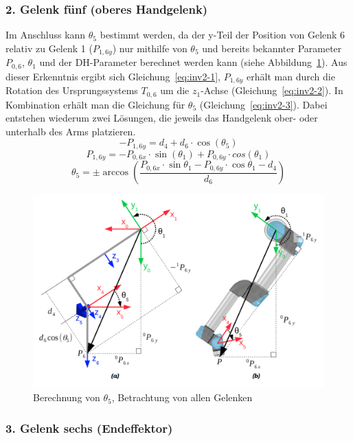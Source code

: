 \subsubsection{2. Gelenk fünf (oberes Handgelenk)}

Im Anschluss kann $\theta_5$ bestimmt werden, da der y-Teil der Position von Gelenk 6 relativ zu Gelenk 1 ($P_{1,6y}$) nur mithilfe von $\theta_5$ und bereits bekannter Parameter $P_{0,6}$, $\theta_1$ und der DH-Parameter berechnet werden kann (siehe Abbildung~\ref{fig:inv1-2}).
Aus dieser Erkenntnis ergibt sich Gleichung~\ref{eq:inv2-1}, $P_{1,6y}$ erhält man durch die Rotation des Ursprungssystems $T_{0,6}$ um die $z_1$-Achse (Gleichung~\ref{eq:inv2-2}).
In Kombination erhält man die Gleichung für $\theta_5$ (Gleichung~\ref{eq:inv2-3}).
Dabei entstehen wiederum zwei Lösungen, die jeweils das Handgelenk ober- oder unterhalb des Arms platzieren.
\begin{equation}
    - P_{1,6y} = d_4 + d_6 \cdot \cos(\theta_5)
    \label{eq:inv2-1}
\end{equation}
\begin{equation}
    P_{1,6y} = - P_{0,6x} \cdot \sin(\theta_1) + P_{0,6y} \cdot cos(\theta_1)
    \label{eq:inv2-2}
\end{equation}
\begin{equation}
    \theta_5 = \pm \arccos \left( \frac{ P_{0,6x} \cdot \sin\theta_1 - P_{0,6y} \cdot \cos\theta_1 - d_4 }{ d_6 } \right)
    \label{eq:inv2-3}
\end{equation}
\begin{figure}[h]
    \centering
    \includegraphics[width = .5\textwidth]{Bilder/inv2}
    \caption{Berechnung von $\theta_5$, Betrachtung von allen Gelenken~\cite{rasmusandersenKinematicsUR52018}}\label{fig:inv1-2}
\end{figure}

\subsubsection{3. Gelenk sechs (Endeffektor)}

